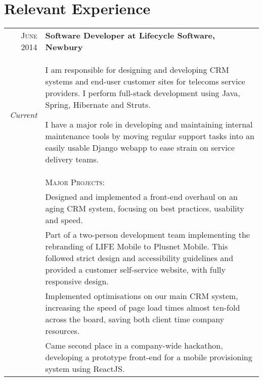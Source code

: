 \section{Relevant Experience}
\begin{tabular}{r|p{11cm}}
	\textsc{June 2014} & \textbf{Software Developer at Lifecycle Software, Newbury} \\
	\emph{Current} & \footnotesize{I am responsible for designing and developing CRM systems and end-user customer sites for telecoms service providers. I perform full-stack development using Java, Spring, Hibernate and Struts.

	I have a major role in developing and maintaining internal maintenance tools by moving regular support tasks into an easily usable Django webapp to ease strain on service delivery teams.
	} \\

		\ & \vspace{1pt}  \textsc{Major Projects}: \\
	&\tabitem Designed and implemented a front-end overhaul on an aging CRM system, focusing on best practices, usability and speed. \\ 
	&\tabitem Part of a two-person development team implementing the rebranding of LIFE Mobile to Plusnet Mobile. This followed strict design and accessibility guidelines and provided a customer self-service website, with fully responsive design. \\
	&\tabitem Implemented optimisations on our main CRM system, increasing the speed of page load times almost ten-fold across the board, saving both client time company resources. \\
	&\tabitem Came second place in a company-wide hackathon, developing a prototype front-end for a mobile provisioning system using ReactJS. \\
	
\end{tabular}